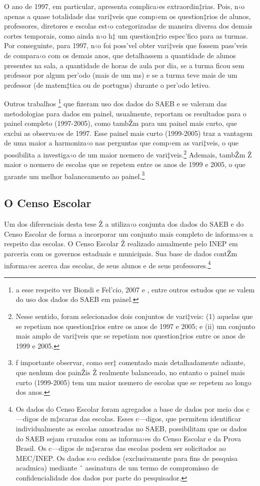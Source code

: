\documentclass[a4paper, 12pt]{article}
\begin{document}
O ano de 1997, em particular, apresenta complica›es extraordin‡rias. Pois, n‹o apenas a quase totalidade das vari‡veis que comp›em os question‡rios de alunos, professores, diretores e escolas est‹o categorizadas de maneira diversa dos demais cortes temporais, como ainda n‹o h‡ um question‡rio espec’fico para as turmas. Por conseguinte, para 1997, n‹o foi poss’vel obter vari‡veis que fossem pass’veis de compara‹o com os demais anos, que detalhassem a quantidade de alunos presentes na sala, a quantidade de horas de aula por dia, se a turma ficou sem professor por algum per’odo (mais de um ms) e se a turma teve mais de um professor (de matem‡tica ou de portugus) durante o per’odo letivo.

Outros trabalhos \footnote{a esse respeito ver Biondi e Fel’cio, 2007 e \cite{franco_2010_impactos}, entre outros estudos que se valem do uso dos dados do SAEB em painel.} que fizeram uso dos dados do SAEB e se valeram das metodologias para dados em painel, usualmente, reportam os resultados para o painel completo (1997-2005), como tambŽm para um painel mais curto, que exclui as observa›es de 1997. Esse painel mais curto (1999-2005) traz a vantagem de uma maior a harmoniza‹o nas perguntas que comp›em as vari‡veis, o que possibilita a investiga‹o de um maior nœmero de vari‡veis.\footnote{Nesse sentido, foram selecionados dois conjuntos de vari‡veis: (1) aquelas que se repetiam nos question‡rios entre os anos de 1997 e 2005; e (ii) um conjunto mais amplo de vari‡veis que se repetiam nos question‡rios entre os anos de 1999 e 2005.} Ademais, tambŽm Ž maior o nœmero de escolas que se repetem entre os anos de 1999 e 2005, o que garante um melhor balanceamento ao painel.\footnote{ƒ importante observar, como ser‡ comentado mais detalhadamente adiante, que nenhum dos painŽis Ž realmente balanceado, no entanto o painel mais curto (1999-2005) tem um maior nœmero de escolas que se repetem ao longo dos anos.} 

\subsection{O Censo Escolar}

Um dos diferenciais desta tese Ž a utiliza‹o conjunta dos dados do SAEB e do Censo Escolar de forma a incorporar um conjunto mais completo de informa›es a respeito das escolas. O Censo Escolar Ž realizado anualmente pelo INEP em parceria com os governos estaduais e municipais. Sua base de dados contŽm informa›es acerca das escolas, de seus alunos e de seus professores.\footnote{Os dados do Censo Escolar foram agregados a base de dados por meio dos c—digos de m‡scaras das escolas. Esses c—digos, que permitem identificar individualmente as escolas amostradas no SAEB, possibilitam que os dados do SAEB sejam cruzados com as informa›es do Censo Escolar e da Prova Brasil. Os c—digos de m‡scaras das escolas podem ser solicitados ao MEC/INEP. Os dados s‹o cedidos (exclusivamente para fins de pesquisa acadmica) mediante ˆ assinatura de um termo de compromisso de confidencialidade dos dados por parte do pesquisador.} 
\end{document}
